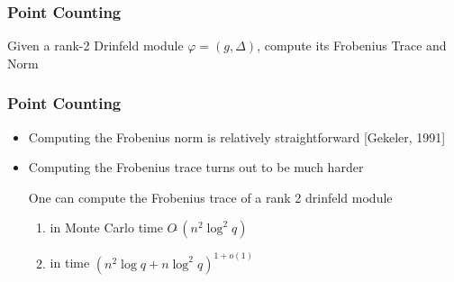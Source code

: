 \documentclass{beamer}
\newcommand{\f}{\mathbb{F}}
\begin{document}
\begin{frame}
\frametitle{Point Counting}

\begin{problem}
Given a rank-2 Drinfeld module $\varphi = (g,\Delta)$, compute its Frobenius Trace and Norm
\end{problem}

\end{frame}










\begin{frame}
\frametitle{Point Counting}

\begin{itemize}
\item Computing the Frobenius norm is relatively straightforward [Gekeler, 1991]
\item Computing the Frobenius trace turns out to be much harder

\begin{theorem}
One can compute the Frobenius trace of a rank 2 drinfeld module
\begin{enumerate}
\item in Monte Carlo time $O\tilde{~}(n^2 \log^2 q)$
\item in time $(n^2 \log q + n \log^2 q)^{1+o(1)}$

\end{enumerate}
\end{theorem}

\end{itemize}


\end{frame}
\end{document}
